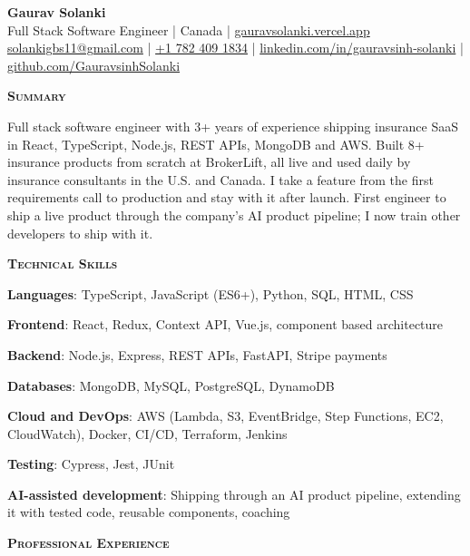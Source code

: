 \documentclass[10pt,letterpaper]{article}
\newcommand{\resumesection}[1]{%
  \vspace{5pt}%
  {\large\bfseries\scshape #1}\par
  \vspace{1pt}{\color{rule}\hrule height 0.6pt}\vspace{3pt}%
}
\newcommand{\skillrow}[2]{\textbf{#1}: #2\par\vspace{1pt}}
\begin{document}
\begin{center}
  {\LARGE\bfseries Gaurav Solanki}\\[2pt]
  Full Stack Software Engineer \;|\; Canada \;|\; \href{https://gauravsolanki.vercel.app}{gauravsolanki.vercel.app}\\[2pt]
  \href{mailto:solankigbs11@gmail.com}{solankigbs11@gmail.com} \;|\;
  \href{tel:+17824091834}{+1 782 409 1834} \;|\;
  \href{https://www.linkedin.com/in/gauravsinh-solanki/}{linkedin.com/in/gauravsinh-solanki} \;|\;
  \href{https://github.com/GauravsinhSolanki}{github.com/GauravsinhSolanki}
\end{center}

\resumesection{Summary}
Full stack software engineer with 3+ years of experience shipping insurance SaaS in React, TypeScript, Node.js, REST APIs, MongoDB and AWS. Built 8+ insurance products from scratch at BrokerLift, all live and used daily by insurance consultants in the U.S. and Canada. I take a feature from the first requirements call to production and stay with it after launch. First engineer to ship a live product through the company's AI product pipeline; I now train other developers to ship with it.

\resumesection{Technical Skills}
\skillrow{Languages}{TypeScript, JavaScript (ES6+), Python, SQL, HTML, CSS}
\skillrow{Frontend}{React, Redux, Context API, Vue.js, component based architecture}
\skillrow{Backend}{Node.js, Express, REST APIs, FastAPI, Stripe payments}
\skillrow{Databases}{MongoDB, MySQL, PostgreSQL, DynamoDB}
\skillrow{Cloud and DevOps}{AWS (Lambda, S3, EventBridge, Step Functions, EC2, CloudWatch), Docker, CI/CD, Terraform, Jenkins}
\skillrow{Testing}{Cypress, Jest, JUnit}
\skillrow{AI-assisted development}{Shipping through an AI product pipeline, extending it with tested code, reusable components, coaching}

\resumesection{Professional Experience}
\end{document}
